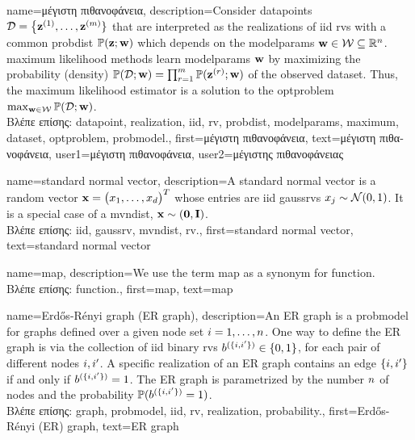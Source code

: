 {name={\foreignlanguage{greek}{μέγιστη πιθανοφάνεια}}, 
	description={Consider \gls{datapoint}s $\mathcal{D}=\big\{ {\bf z}^{(1)}, \ldots, {\bf z}^{(m)} \}$ 
		that are interpreted as the \gls{realization}s of \gls{iid} \gls{rv}s with a common \gls{probdist} $\mathbb{P}({{\bf z}; {\bf w}})$ which 
		depends on the \gls{modelparams} ${\bf w} \in \mathcal{W} \subseteq \mathbb{R}^{n}$. 
		\Gls{maximum} likelihood methods learn \gls{modelparams} ${\bf w}$ by maximizing 
		the probability (density) $\mathbb{P}({\mathcal{D}; {\bf w}}) = \prod_{r=1}^{m} \mathbb{P}({{\bf z}^{(r)}; {\bf w}})$ 
		of the observed \gls{dataset}. Thus, the \gls{maximum} likelihood estimator is a 
		solution to the \gls{optproblem} $\max_{{\bf w} \in \mathcal{W}} \mathbb{P}({\mathcal{D}; {\bf w}})$.\\
		\foreignlanguage{greek}{Βλέπε επίσης:} \gls{datapoint}, \gls{realization}, \gls{iid}, \gls{rv}, \gls{probdist}, \gls{modelparams}, \gls{maximum}, 
		\gls{dataset}, \gls{optproblem}, \gls{probmodel}.},
	first={\foreignlanguage{greek}{μέγιστη πιθανοφάνεια}},
	text={\foreignlanguage{greek}{μέγιστη πιθανοφάνεια}},
	user1={\foreignlanguage{greek}{μέγιστη πιθανοφάνεια}}, %
  	user2={\foreignlanguage{greek}{μέγιστης πιθανοφά\-νει\-ας}} %
}

{name={standard normal vector}, 
	description={A standard normal vector is a random vector ${\bf x}=\big(x_{1}, \ldots, x_{d}\big)^{T}$ 
		whose entries are \gls{iid} \gls{gaussrv}s $x_{j} \sim \mathcal{N}(0,1)$. 
		It is a special case of a \gls{mvndist}, ${\bf x} \sim \mathcal(\mathbf{0},\mathbf{I})$. \\ 
		\foreignlanguage{greek}{Βλέπε επίσης:} \gls{iid}, \gls{gaussrv}, \gls{mvndist}, \gls{rv}.}, 
	first={standard normal vector},
	text={standard normal vector}
}

{name={map},
	description={We use the term map as a synonym for \gls{function}. \\
		\foreignlanguage{greek}{Βλέπε επίσης:} \gls{function}.},
	first={map},
	text={map}
}

{name={Erd\H{o}s-R\'enyi graph (ER graph)},
	description={An ER \gls{graph} is a \gls{probmodel} for  \gls{graph}s defined over 
		a given node set $i=1, \ldots, n$. One way to define the ER \gls{graph} is 
		via the collection of \gls{iid} binary \gls{rv}s $b^{(\{i,i'\})} \in \{0,1\}$, 
		for each pair of different nodes $i, i'$. A specific \gls{realization}  
		of an ER \gls{graph} contains an edge $\{i,i'\}$ if and only if 
		$b^{(\{i,i'\})}=1$. The ER \gls{graph} is parametrized by the 
		number $n$ of nodes and the \gls{probability} $\mathbb{P}({b^{(\{i,i'\})}=1})$. \\
		\foreignlanguage{greek}{Βλέπε επίσης:} \gls{graph}, \gls{probmodel}, \gls{iid}, \gls{rv}, \gls{realization}, \gls{probability}.},
	first={Erd\H{o}s-R\'enyi (ER) graph},
	text={ER graph}
}

